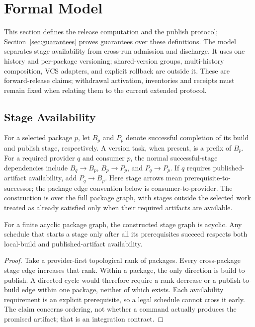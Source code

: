 \section{Formal Model}
\label{sec:model}

This section defines the release computation and the publish protocol;
Section~\ref{sec:guarantees} proves guarantees over these definitions.
The model separates stage availability from cross-run admission and discharge.
It uses one history and per-package versioning; shared-version groups,
multi-history composition, VCS adapters, and explicit rollback are outside it.
These are forward-release claims; withdrawal activation, inventories and receipts
must remain fixed when relating them to the current extended protocol.


\subsection{Stage Availability}
For a selected package $p$, let $B_p$ and $P_p$ denote successful completion
of its build and publish stage, respectively. A version task, when present,
is a prefix of $B_p$. For a required provider $q$ and consumer $p$, the normal
successful-stage dependencies include $B_q\to B_p$, $B_p\to P_p$, and
$P_q\to P_p$. If $q$ requires published-artifact availability, add
$P_q\to B_p$. Here stage arrows mean prerequisite-to-successor; the package
edge convention below is consumer-to-provider. The construction is over the
full package graph, with stages outside the selected work treated as already
satisfied only when their required artifacts are available.

\begin{proposition}
\label{prop:stages}
For a finite acyclic package graph, the constructed stage graph is acyclic.
Any schedule that starts a stage only after all its prerequisites succeed
respects both local-build and published-artifact availability.
\end{proposition}
\begin{proof}
Take a provider-first topological rank of packages. Every cross-package stage
edge increases that rank. Within a package, the only direction is build to
publish. A directed cycle would therefore require a rank decrease or a
publish-to-build edge within one package, neither of which exists. Each
availability requirement is an explicit prerequisite, so a legal schedule
cannot cross it early. The claim concerns ordering, not whether a command
actually produces the promised artifact; that is an integration contract.
\end{proof}

